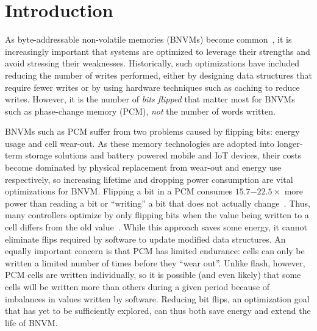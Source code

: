 
\section{Introduction}

As byte-addressable non-volatile memories (BNVMs) become
common~\cite{lee_architecting_2009,fox:2001feram,intel3dxpoint}, it is
increasingly important that systems are optimized to leverage their
strengths and avoid stressing their weaknesses.  Historically, such
optimizations have included reducing the number of writes performed, either by
designing data structures that require fewer writes or by using hardware
techniques such as caching to reduce writes. However, it is the number of \emph{bits flipped} that
matter most for BNVMs such as phase-change memory (PCM), \emph{not} the number of words written.


BNVMs such as PCM suffer from two problems caused by flipping bits: energy usage
and cell wear-out.
As these memory technologies are adopted into longer-term storage solutions and
battery powered mobile and IoT devices, their costs become dominated by physical
replacement from wear-out and energy use respectively, so increasing lifetime
and dropping power consumption are vital optimizations for BNVM.
Flipping a bit in a PCM consumes
$15.7\mathit{-}22.5\times$ more power than reading a bit or ``writing''
a bit that does not actually
change~\cite{dhiman_pdram:_2009,lee_architecting_2009,xiangyu_dong_nvsim:_2012,qureshi_scalable_2009}.
Thus, many controllers optimize by only flipping bits when the value being
written to a cell differs from the old value~\cite{yang:iscas07}.  While this
approach saves some energy, it cannot eliminate flips required by software to
update modified data structures. An equally important concern is that PCM has
limited endurance: cells can only be written a limited number of times before
they ``wear out''. Unlike flash, however, PCM cells are written individually, so
it is possible (and even likely) that some cells will be written more than
others during a given period because of imbalances in values written by
software. Reducing bit flips, an optimization goal that has yet to be
sufficiently explored, can thus both save energy and extend the life of BNVM.

%


